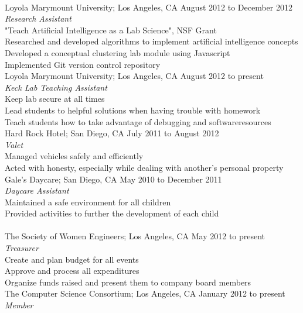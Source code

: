 \documentclass[11pt]{article}
\begin{document}
\vspace{1.5mm}\\
\indent Loyola Marymount University; Los Angeles, CA \hfill August 2012 to December 2012\\
\indent \emph{Research Assistant}\\
\indent \indent "Teach Artificial Intelligence as a Lab Science", NSF Grant\\
\indent \indent Researched and developed algorithms to implement artificial intelligence concepts\\
\indent \indent Developed a conceptual clustering lab module using Javascript\\
\indent \indent Implemented Git version control repository\vspace{2mm}\\
\indent Loyola Marymount University; Los Angeles, CA \hfill August 2012 to present\\
\indent \emph{Keck Lab Teaching Assistant}\\
\indent \indent Keep lab secure at all times\\
\indent \indent Lead students to helpful solutions when having trouble with homework\\
\indent \indent Teach students how to take advantage of debugging and softwareresources\vspace{2mm}\\
\indent Hard Rock Hotel; San Diego, CA \hfill July 2011 to August 2012\\
\indent \emph{Valet}\\
\indent \indent Managed vehicles safely and efficiently\\
\indent \indent Acted with honesty, especially while dealing with another’s personal property\vspace{2mm}\\
\indent Gale’s Daycare; San Diego, CA \hfill May 2010 to December 2011\\
\indent \emph{Daycare Assistant}\\
\indent \indent Maintained a safe environment for all children\\
\indent \indent Provided activities to further the development of each child\\

\vspace{1.5mm}\\
\indent The Society of Women Engineers; Los Angeles, CA \hfill May 2012 to present\\
\indent \emph{Treasurer}\\
\indent \indent Create and plan budget for all events\\
\indent \indent Approve and process all expenditures\\
\indent \indent Organize funds raised and present them to company board members\vspace{2mm}\\
\indent The Computer Science Consortium; Los Angeles, CA \hfill January 2012 to present\\
\indent \emph{Member}
\end{document}
